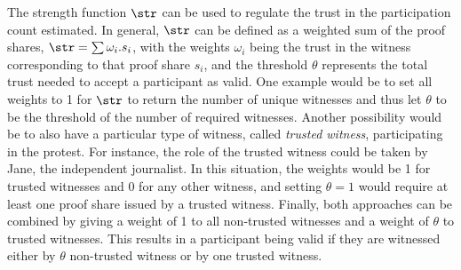 The strength function \(\str\) can be used to regulate the trust in the participation count estimated. In general, \(\str\) can be defined as a weighted sum of the proof shares, $\str = \sum \omega_i.s_i$, with the weights $\omega_i$ being the trust in the witness corresponding to that proof share $s_i$, and the threshold $\theta$ represents the total trust needed to accept a participant as valid.
One example would be to set all weights to 1 for \(\str\) to return the number of unique witnesses and thus let \(\theta\) to be the threshold of the number of required witnesses.
Another possibility would be to also have a particular type of witness, called \emph{trusted witness}, participating in the protest. 
For instance, the role of the trusted witness could be taken by Jane, the independent journalist. 
In this situation, the weights would be 1 for trusted witnesses and 0 for any other witness, and
setting \(\theta = 1\) would require at least one proof share issued by a trusted witness.
Finally, both approaches can be combined by giving a weight of 1 to all non-trusted witnesses and a weight of $\theta$ to trusted witnesses. This results in a participant being valid if they are witnessed either by $\theta$ non-trusted witness or by one trusted witness.

